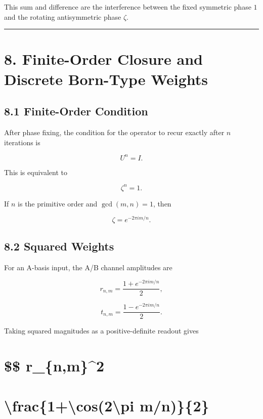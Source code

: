 \documentclass[
  a4paper,
  10pt]{article}
\begin{document}
This sum and difference are the interference between the fixed symmetric
phase \(1\) and the rotating antisymmetric phase \(\zeta\).

\begin{center}\rule{0.5\linewidth}{0.5pt}\end{center}

\section{8. Finite-Order Closure and Discrete Born-Type
Weights}\label{8-finite-order-closure-and-discrete-born-type-weights}

\subsection{8.1 Finite-Order Condition}\label{81-finite-order-condition}

After phase fixing, the condition for the operator to recur exactly
after \(n\) iterations is

\[
U^n=I.
\]

This is equivalent to

\[
\zeta^n=1.
\]

If \(n\) is the primitive order and \(\gcd(m,n)=1\), then

\[
\zeta=e^{-2\pi im/n}.
\]

\subsection{8.2 Squared Weights}\label{82-squared-weights}

For an A-basis input, the A/B channel amplitudes are

\[
r_{n,m}=\frac{1+e^{-2\pi im/n}}{2},
\]

\[
t_{n,m}=\frac{1-e^{-2\pi im/n}}{2}.
\]

Taking squared magnitudes as a positive-definite readout gives

\section{\$\$ \textbar r\_\{n,m\}\textbar\^{}2}\label{-r_nm2}

\section{\textbackslash frac\{1+\textbackslash cos(2\textbackslash pi
m/n)\}\{2\}}\label{frac1cos2pi-mn2}
\end{document}

